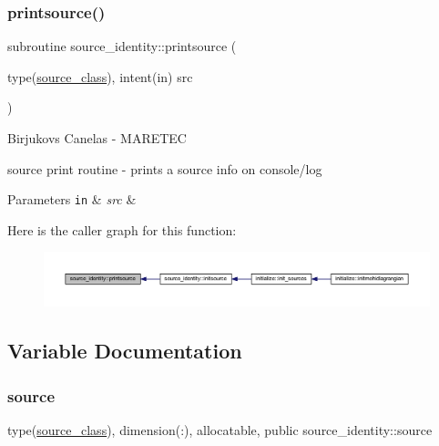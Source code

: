 \subsubsection{\texorpdfstring{printsource()}{printsource()}}
{\footnotesize\ttfamily subroutine source\+\_\+identity\+::printsource (\begin{DoxyParamCaption}\item[{type(\mbox{\hyperlink{structsource__identity_1_1source__class}{source\+\_\+class}}), intent(in)}]{src }\end{DoxyParamCaption})\hspace{0.3cm}{\ttfamily [private]}}



Birjukovs Canelas -\/ M\+A\+R\+E\+T\+EC 

source print routine -\/ prints a source info on console/log 
\begin{DoxyParams}[1]{Parameters}
\mbox{\tt in}  & {\em src} & \\
\hline
\end{DoxyParams}
Here is the caller graph for this function\+:\nopagebreak
\begin{figure}[H]
\begin{center}
\leavevmode
\includegraphics[width=350pt]{namespacesource__identity_ac4fc3a54de91016023a7948d261f84a5_icgraph}
\end{center}
\end{figure}


\subsection{Variable Documentation}
\mbox{\label{namespacesource__identity_a5ed8006613af7461c6a2ff1cdaeb8f0f}} 
\subsubsection{\texorpdfstring{source}{source}}
{\footnotesize\ttfamily type(\mbox{\hyperlink{structsource__identity_1_1source__class}{source\+\_\+class}}), dimension(\+:), allocatable, public source\+\_\+identity\+::source}


